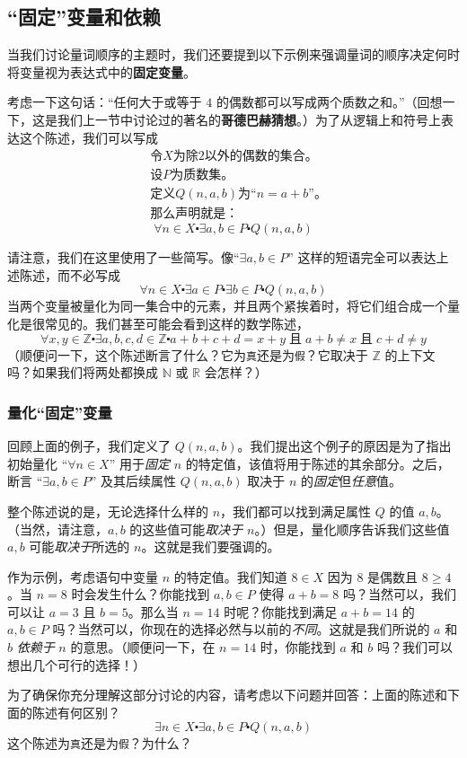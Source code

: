 \subsection{``固定''变量和依赖}\label{sec:section4.3.3}

当我们讨论量词顺序的主题时，我们还要提到以下示例来强调量词的顺序决定何时将变量视为表达式中的\textbf{固定变量}。

考虑一下这句话：``任何大于或等于 $4$ 的偶数都可以写成两个质数之和。''（回想一下，这是我们上一节中讨论过的著名的\textbf{哥德巴赫猜想}。）为了从逻辑上和符号上表达这个陈述，我们可以写成
\begin{align*}
    &\text{令} X \text{为除} 2 \text{以外的偶数的集合。}\\
    &\text{设} P \text{为质数集。}\\
    &\text{定义} Q(n, a, b) \text{为``}n = a + b\text{''。}\\
    &\text{那么声明就是：}
\end{align*}
\[\forall n \in X \centerdot \exists a, b \in P \centerdot Q(n, a, b)\]

请注意，我们在这里使用了一些简写。像``$\exists a, b \in P$'' 这样的短语完全可以表达上述陈述，而不必写成
\[\forall n \in X \centerdot \exists a \in P \centerdot \exists b \in P \centerdot Q(n, a, b)\]
当两个变量被量化为同一集合中的元素，并且两个紧挨着时，将它们组合成一个量化是很常见的。我们甚至可能会看到这样的数学陈述，
\[\forall x, y \in \mathbb{Z} \centerdot \exists a, b, c, d \in \mathbb{Z} \centerdot a + b + c + d = x + y \;\text{且}\; a + b \ne x \;\text{且}\; c + d \ne y\]
（顺便问一下，这个陈述断言了什么？它为\verb|真|还是为\verb|假|？它取决于 $\mathbb{Z}$ 的上下文吗？如果我们将两处都换成 $\mathbb{N}$ 或 $\mathbb{R}$ 会怎样？）

\subsubsection*{量化``固定''变量}

回顾上面的例子，我们定义了 $Q(n, a, b)$。我们提出这个例子的原因是为了指出初始量化 ``$\forall n \in X$'' 用于\emph{固定} $n$ 的特定值，该值将用于陈述的其余部分。之后，断言 ``$\exists a, b \in P$'' 及其后续属性 $Q(n, a, b)$ 取决于 $n$ 的\emph{固定}但\emph{任意}值。

整个陈述说的是，无论选择什么样的 $n$，我们都可以找到满足属性 $Q$ 的值 $a, b$。（当然，请注意，$a, b$ 的这些值可能\emph{取决于} $n$。）但是，量化顺序告诉我们这些值 $a, b$ 可能\emph{取决于}所选的 $n$。这就是我们要强调的。

作为示例，考虑语句中变量 $n$ 的特定值。我们知道 $8 \in X$ 因为 $8$ 是偶数且 $8 \ge 4$。当 $n = 8$ 时会发生什么？你能找到 $a, b \in P$ 使得 $a + b = 8$ 吗？当然可以，我们可以让 $a = 3$ 且 $b = 5$。那么当 $n = 14$ 时呢？你能找到满足 $a+b = 14$ 的 $a, b \in P$ 吗？当然可以，你现在的选择必然与以前的\emph{不同}。这就是我们所说的 $a$ 和 $b$ \emph{依赖于} $n$ 的意思。（顺便问一下，在 $n = 14$ 时，你能找到 $a$ 和 $b$ 吗？我们可以想出几个可行的选择！）

为了确保你充分理解这部分讨论的内容，请考虑以下问题并回答：上面的陈述和下面的陈述有何区别？
\[\exists n \in X \centerdot \exists a, b \in P \centerdot Q(n, a, b)\]
这个陈述为\verb|真|还是为\verb|假|？为什么？
